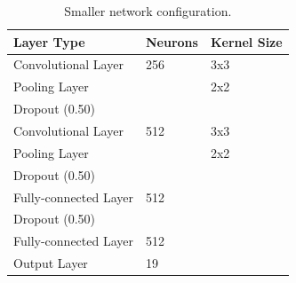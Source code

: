 \documentclass[journal]{IEEEtran}
\begin{document}
\begin{table}[]
\centering
\caption{Smaller network configuration.}
\label{table:network_configuration_smaller}
\begin{tabular}{|l|l|l|}
\hline
\textbf{Layer Type}   & \textbf{Neurons} & \textbf{Kernel Size} \\ \hline
Convolutional Layer   & 256              & 3x3                  \\ \hline
Pooling Layer         &                  & 2x2                  \\ \hline
Dropout (0.50)        &                  &                      \\ \hline
Convolutional Layer   & 512              & 3x3                  \\ \hline
Pooling Layer         &                  & 2x2                  \\ \hline
Dropout (0.50)        &                  &                      \\ \hline
Fully-connected Layer & 512              &                      \\ \hline
Dropout (0.50)        &                  &                      \\ \hline
Fully-connected Layer & 512              &                      \\ \hline
Output Layer          & 19               &                      \\ \hline
\end{tabular}
\end{table}
\end{document}

